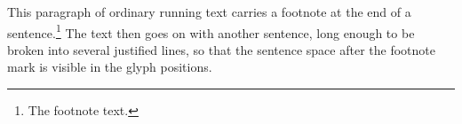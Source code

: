 \hsize=4in
This paragraph of ordinary running text carries a footnote at the end of a sentence.\footnote*{The footnote text.} The text then goes on with another sentence, long enough to be broken into several justified lines, so that the sentence space after the footnote mark is visible in the glyph positions.
\bye
